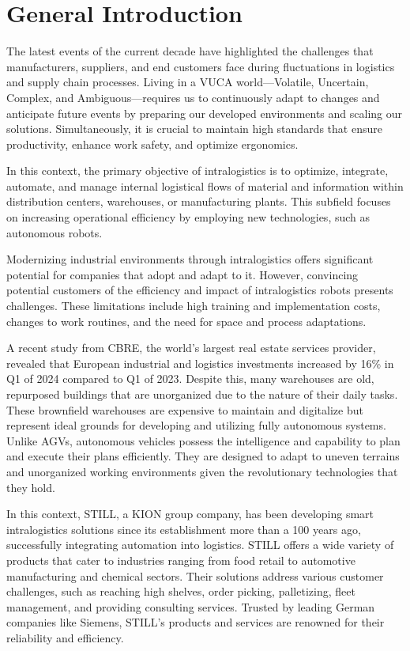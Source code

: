 \chapter*{General Introduction}%
The latest events of the current decade have highlighted the challenges that manufacturers, suppliers, and end customers
face during fluctuations in logistics and supply chain processes. Living in a VUCA world—Volatile, Uncertain, Complex,
and Ambiguous—requires us to continuously adapt to changes and anticipate future events by preparing our developed
environments and scaling our solutions. Simultaneously, it is crucial to maintain high standards that ensure productivity,
enhance work safety, and optimize ergonomics. 


In this context, the primary objective of intralogistics is to optimize, integrate, automate, and manage internal 
logistical flows of material and information within distribution centers, warehouses, or manufacturing plants. 
This subfield focuses on increasing operational efficiency by employing new technologies, such as autonomous robots. 

Modernizing industrial environments through intralogistics offers significant potential for companies that adopt and adapt 
to it. However, convincing potential customers of the efficiency and impact of intralogistics robots presents challenges. 
These limitations include high training and implementation costs, changes to work routines, and the need for space and 
process adaptations. 


A recent study from CBRE, the world’s largest real estate services provider, revealed that European industrial and 
logistics investments increased by 16\% in Q1 of 2024 compared to Q1 of 2023. Despite this, many warehouses are old, 
repurposed buildings that are unorganized due to the nature of their daily tasks. These brownfield warehouses are 
expensive to maintain and digitalize but represent ideal grounds for developing and utilizing fully autonomous systems. 
Unlike AGVs, autonomous vehicles possess the intelligence and capability to plan and execute their plans efficiently. 
They are designed to adapt to uneven terrains and unorganized working environments given the revolutionary technologies 
that they hold. 

In this context, STILL, a KION group company, has been developing smart intralogistics solutions since 
its establishment more than a 100 years ago, successfully integrating automation into logistics. STILL offers a wide 
variety of products that cater to industries ranging from food retail to automotive manufacturing and chemical sectors. 
Their solutions address various customer challenges, such as reaching high shelves, order picking, palletizing, 
fleet management, and providing consulting services. Trusted by leading German companies like Siemens, STILL's products 
and services are renowned for their reliability and efficiency. 


